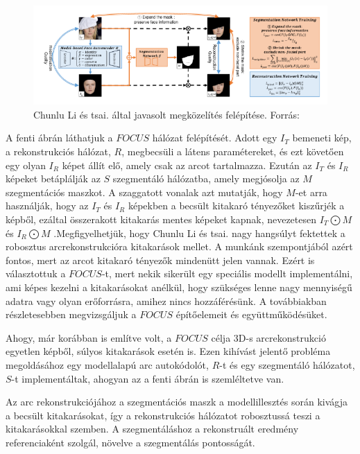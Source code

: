 \documentclass[12pt,a4]{article}
\begin{document}
            \begin{figure}[h]	
     		 \centering
     		 \includegraphics[width=1\linewidth]{focus}
     		 \caption{Chunlu Li és tsai. által javasolt megközelítés felépítése.
     			    Forrás:\cite{focus}}
                    \label{fig:focus}
     	      \end{figure}

            A fenti ábrán láthatjuk a $FOCUS$ hálózat felépítését.
            Adott egy $I_{T}$ bemeneti kép, a rekonstrukciós hálózat, $R$, megbecsüli a látens
     	      paramétereket, és ezt követően egy olyan $I_{R}$ képet állít elő, amely csak az
     	      arcot tartalmazza. Ezután az $I_{T}$ és $I_{R}$ képeket betáplálják az 
            $S$ szegmentáló hálózatba, amely megjósolja az $M$ szegmentációs maszkot. A szaggatott vonalak azt mutatják, hogy $M$-et arra használják, hogy az $I_{T}$ és $I_{R}$ képekben a becsült kitakaró tényezőket kiszűrjék a képből, ezáltal összerakott kitakarás mentes képeket kapnak, nevezetesen $I_{T}\bigodot M$ és $I_{R}\bigodot M$ .Megfigyelhetjük, hogy Chunlu Li és tsai. nagy hangsúlyt fektettek a robosztus arcrekonstrukcióra kitakarások mellet. A munkánk szempontjából
     	      azért fontos, mert az arcot kitakaró tényezők mindenütt jelen vannak. 
            Ezért is választottuk a $FOCUS$-t, mert nekik sikerült egy speciális modellt implementálni, ami képes kezelni a kitakarásokat anélkül, hogy szükséges lenne nagy mennyiségű adatra vagy olyan erőforrásra, amihez nincs hozzáférésünk.
     	      A továbbiakban részletesebben megvizsgáljuk a $FOCUS$ építőelemeit és
     	      együttműködésüket.

            Ahogy, már korábban is említve volt, a $FOCUS$ célja 3D-s
     	      arcrekonstrukció egyetlen képből, súlyos kitakarások esetén is. Ezen kihívást
     	      jelentő probléma megoldásához egy modellalapú arc autokódolót, $R$-t és
     	      egy szegmentáló hálózatot, $S$-t implementáltak, ahogyan az a fenti ábrán is
     	      szemléltetve van.
    
            Az arc rekonstrukciójához a szegmentációs maszk a modellillesztés során
     	      kivágja a becsült kitakarásokat, így a rekonstrukciós hálózatot robosztussá
     	      teszi a kitakarásokkal szemben. A szegmentáláshoz a rekonstruált eredmény
     	      referenciaként szolgál, növelve a szegmentálás pontosságát.
    
\end{document}
